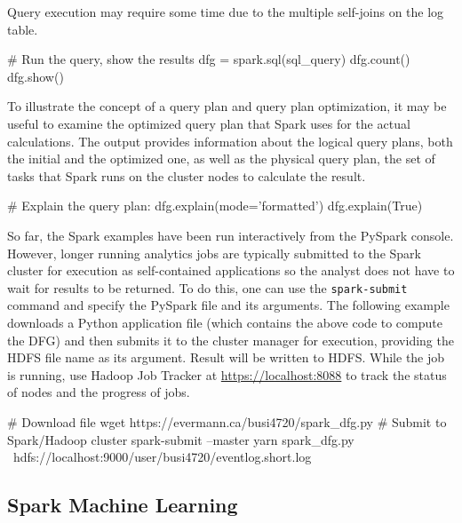 Query execution may require some time due to the multiple self-joins on the log table. 

\begin{samepage}
\begin{pythoncode}
# Run the query, show the results
dfg = spark.sql(sql_query)
dfg.count()
dfg.show()
\end{pythoncode}
\end{samepage}

To illustrate the concept of a query plan and query plan optimization, it may be useful to examine the optimized query plan that Spark uses for the actual calculations. The output provides information about the logical query plans, both the initial and the optimized one, as well as the physical query plan, the set of tasks that Spark runs on the cluster nodes to calculate the result.

\begin{samepage}
\begin{pythoncode}
# Explain the query plan:
dfg.explain(mode='formatted')
dfg.explain(True)
\end{pythoncode}
\end{samepage}

So far, the Spark examples have been run interactively from the PySpark console. However, longer running analytics jobs are typically submitted to the Spark cluster for execution as self-contained applications so the analyst does not have to wait for results to be returned. To do this, one can use the \texttt{spark-submit} command and specify the PySpark file and its arguments. The following example downloads a Python application file (which contains the above code to compute the DFG) and then submits it to the cluster manager for execution, providing the HDFS file name as its argument. Result will be written to HDFS. While the job is running, use Hadoop Job Tracker at \url{https://localhost:8088} to track the status of nodes and the progress of jobs.

\begin{samepage}
\begin{bashcode}
# Download file
wget https://evermann.ca/busi4720/spark_dfg.py
# Submit to Spark/Hadoop cluster
spark-submit --master yarn spark_dfg.py \
 hdfs://localhost:9000/user/busi4720/eventlog.short.log
\end{bashcode}
\end{samepage}

\subsection{Spark Machine Learning}


